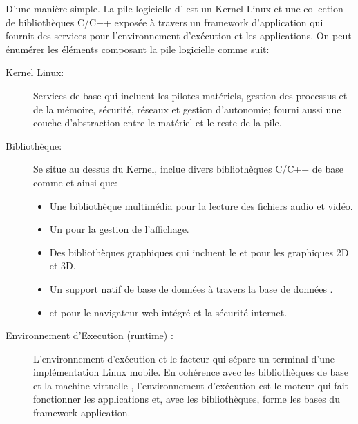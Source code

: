 D'une manière simple. La pile logicielle d'\android{} est un Kernel Linux et une collection de bibliothèques C/C++ exposée à travers un framework d'application qui fournit des services pour l'environnement d'exécution et les applications. On peut énumérer les éléments composant la pile logicielle comme suit:

\begin{description}

\item [Kernel Linux:]
Services de base qui incluent les pilotes matériels, gestion des processus et de la mémoire, sécurité, réseaux et gestion d'autonomie; fourni aussi une couche d'abstraction entre le matériel et le reste de la pile.

\item [Bibliothèque:]
Se situe au dessus du Kernel, \android{} inclue divers bibliothèques C/C++ de base comme  et  ainsi que:

\begin{itemize}

\item Une bibliothèque multimédia pour la lecture des fichiers audio et vidéo.

\item Un  pour la gestion de l'affichage.

\item Des bibliothèques graphiques qui incluent le  et  pour les graphiques 2D et 3D.

\item Un support natif de base de données à travers la base de données .

\item {} et  pour le navigateur web intégré et la sécurité internet.

\end{itemize}

\item [Environnement d'Execution (runtime) \android{}:]

L'environnement d’exécution et le facteur qui sépare un terminal \android{}
d'une implémentation Linux mobile. En cohérence avec les bibliothèques de base
et la machine virtuelle , l'environnement d’exécution \android{} est
le moteur qui fait fonctionner les applications et, avec les bibliothèques,
forme les bases du framework application.

\begin{description}


\end{description}
\end{description}
